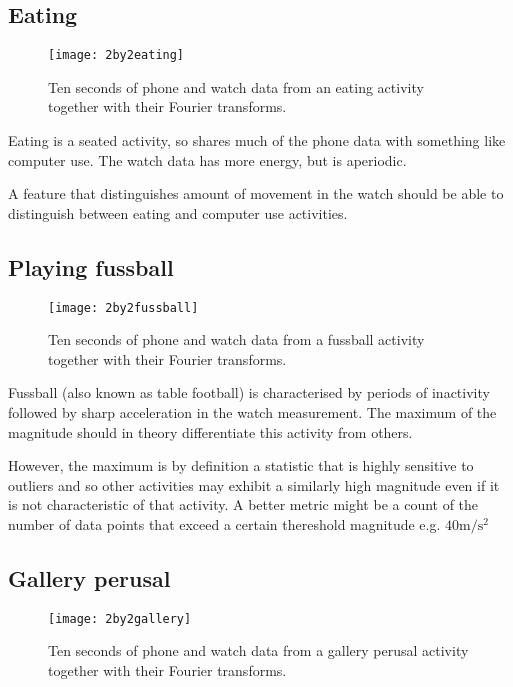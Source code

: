     \subsection{Eating}
      \begin{figure}[!th]
        \centering
        \texttt{[image: 2by2eating]}
        \caption{Ten seconds of phone and watch data from an eating activity together with their Fourier transforms.}
        \label{fig:2by2eating}
      \end{figure}
      
      Eating is a seated activity, so shares much of the phone data with something like computer use. The watch data has more energy, but is aperiodic.
      
      A feature that distinguishes amount of movement in the watch should be able to distinguish between eating and computer use activities.
    \subsection{Playing fussball}
      \begin{figure}[!th]
        \centering
        \texttt{[image: 2by2fussball]}
        \caption{Ten seconds of phone and watch data from a fussball activity together with their Fourier transforms.}
        \label{fig:2by2fussball}
      \end{figure}
      
      Fussball (also known as table football) is characterised by periods of inactivity followed by sharp acceleration in the watch measurement. The maximum of the magnitude should in theory differentiate this activity from others.
      
      However, the maximum is by definition a statistic that is highly sensitive to outliers and so other activities may exhibit a similarly high magnitude even if it is not characteristic of that activity. A better metric might be a count of the number of data points that exceed a certain thereshold magnitude e.g. $40 \si{\metre\per\square\second}$ 
    \subsection{Gallery perusal}
      \begin{figure}[!th]
        \centering
        \texttt{[image: 2by2gallery]}
        \caption{Ten seconds of phone and watch data from a gallery perusal activity together with their Fourier transforms.}
        \label{fig:2by2gallery}
      \end{figure}
      
